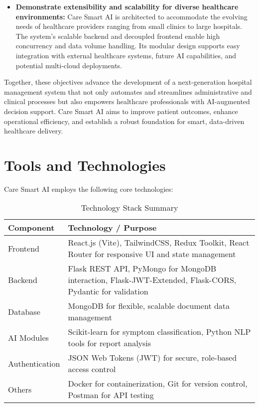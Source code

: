 \documentclass[conference]{IEEEtran}
\begin{document}
\begin{itemize}
    \item \textbf{Demonstrate extensibility and scalability for diverse healthcare environments:} Care Smart AI is architected to accommodate the evolving needs of healthcare providers ranging from small clinics to large hospitals. The system's scalable backend and decoupled frontend enable high concurrency and data volume handling. Its modular design supports easy integration with external healthcare systems, future AI capabilities, and potential multi-cloud deployments.
\end{itemize}

Together, these objectives advance the development of a next-generation hospital management system that not only automates and streamlines administrative and clinical processes but also empowers healthcare professionals with AI-augmented decision support. Care Smart AI aims to improve patient outcomes, enhance operational efficiency, and establish a robust foundation for smart, data-driven healthcare delivery.



\section{Tools and Technologies}
Care Smart AI employs the following core technologies:

\begin{table}[ht]
\caption{Technology Stack Summary}
\label{tab:techstack}
\centering
\begin{tabular}{|p{3cm}|p{6cm}|}
\hline
\textbf{Component} & \textbf{Technology / Purpose} \\
\hline
Frontend & React.js (Vite), TailwindCSS, Redux Toolkit, React Router for responsive UI and state management \\
Backend & Flask REST API, PyMongo for MongoDB interaction, Flask-JWT-Extended, Flask-CORS, Pydantic for validation \\
Database & MongoDB for flexible, scalable document data management \\
AI Modules & Scikit-learn for symptom classification, Python NLP tools for report analysis \\
Authentication & JSON Web Tokens (JWT) for secure, role-based access control \\
Others & Docker for containerization, Git for version control, Postman for API testing \\
\hline
\end{tabular}
\end{table}
\end{document}
